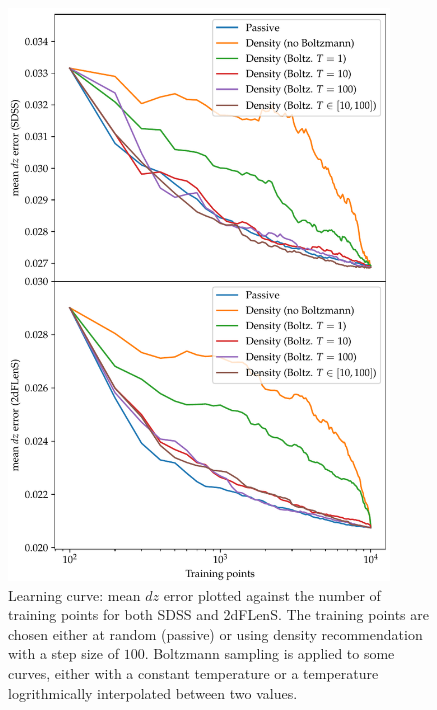 \documentclass[11pt,twoside,openright]{report}
\begin{document}
  \begin{figure}
    \centering
    \includegraphics[width=0.9\textwidth]{boltz_density_dz1.pdf}
    \caption{Learning curve: mean $dz$ error plotted against the number of training points for both SDSS and 2dFLenS. The training points are chosen either at random (passive) or using density recommendation with a step size of $100$. Boltzmann sampling is applied to some curves, either with a constant temperature or a temperature logrithmically interpolated between two values.}
    \label{fig:boltz_density_dz1}
  \end{figure}
\end{document}
